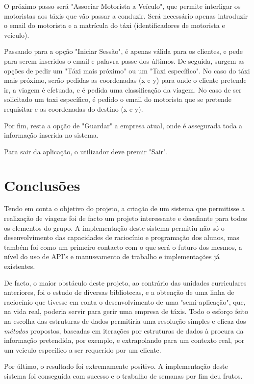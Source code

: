 \documentclass[a4paper]{article}
\begin{document}
\par O próximo passo será "Associar Motorista a Veículo", que permite interligar os motoristas aos táxis que vão passar a conduzir. Será necessário apenas introduzir o email do motorista e a matrícula do táxi (identificadores de motorista e veículo).
\par Passando para a opção "Iniciar Sessão", é apenas válida para os clientes, e pede para serem inseridos o email e palavra passe dos últimos. De seguida, surgem as opções de pedir um "Táxi mais próximo" ou um "Taxi específico". No caso do táxi mais próximo, serão pedidas as coordenadas (x e y) para onde o cliente pretende ir, a viagem é efetuada, e é pedida uma classificação da viagem. No caso  de ser solicitado um taxi específico, é pedido o email do motorista que se pretende requisitar e as coordenadas do destino (x e y).
\par Por fim, resta a opção de "Guardar" a empresa atual, onde é assegurada toda a informação inserida no sistema.
\par Para sair da aplicação, o utilizador deve premir "Sair".

\pagebreak
\section{Conclusões}
\label{sec:7}

\hspace{3mm} Tendo em conta o objetivo do projeto, a criação de um sistema que permitisse a realização de viagens foi de facto um projeto interessante e desafiante para todos os elementos do grupo. A implementação deste sistema permitiu não só o desenvolvimento das capacidades de raciocínio e programação dos alunos, mas também foi como um primeiro contacto com o que será o futuro dos mesmos, a nível do uso de API's e manuseamento de trabalho e implementações já existentes.
\par De facto, o maior obstáculo deste projeto, ao contrário das unidades curriculares anteriores, foi o estudo de diversas bibliotecas, e a obtenção de uma linha de raciocínio que tivesse em conta o desenvolvimento de uma "semi-aplicação", que, na vida real, poderia servir para gerir uma empresa de táxis. Todo o esforço feito na escolha das estruturas de dados permitiria uma resolução simples e eficaz dos \emph{métodos} propostos, baseadas em iterações por estruturas de dados à procura da informação pretendida, por exemplo, e extrapolando para um contexto real, por um veiculo específico a ser requerido por um cliente.
\par Por último, o resultado foi extremamente positivo. A implementação deste sistema foi conseguida com sucesso e o trabalho de semanas por fim deu frutos.
\end{document}
